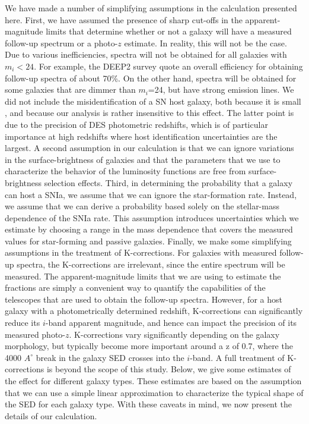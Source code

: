 \documentclass[preprint2]{aastex}    %
\begin{document}
We have made a number of simplifying assumptions in the calculation
presented here. First, we have assumed the presence of sharp cut-offs
in the apparent-magnitude limits that determine whether or not a
galaxy will have a measured follow-up spectrum or a photo-$z$
estimate. In reality, this will not be the case. Due to various
inefficiencies, spectra will not be obtained for all galaxies with
$m_i<24$. For example, the DEEP2 survey \citep{fab07} quote an overall
efficiency for obtaining follow-up spectra of about 70\%. On the other
hand, spectra will be obtained for some galaxies that are dimmer than
$m_i$=24, but have strong emission lines.  
We did not include the misidentification of a SN host galaxy, both
because it is small \cite[][find this to be a 2\% effect at 
low redshift]{smi11}, and because our analysis is rather insensitive to this 
effect. The latter point is
due to the precision of DES photometric redshifts, which is of 
particular importance at high redshifts where host identification 
uncertainties are the largest. 
A second assumption in our calculation is that
we can ignore variations in the surface-brightness of galaxies and
that the parameters that we use to characterize the behavior of the
luminosity functions are free from surface-brightness selection
effects. Third, in determining the probability that a galaxy can host
a SNIa, we assume that we can ignore the star-formation rate. Instead,
we assume that we can derive a probability based solely on the
stellar-mass dependence of the SNIa rate. This assumption introduces
uncertainties which we estimate by choosing a range in the mass
dependence that covers the measured values for star-forming and
passive galaxies.  
Finally, we make some simplifying assumptions in the treatment of K-corrections. 
For galaxies with measured follow-up spectra, the K-corrections are irrelevant, since the entire
spectrum will be measured. The apparent-magnitude limits that we are using to estimate the fractions
are simply a convenient way to quantify the capabilities of the telescopes that are used to obtain 
the follow-up spectra. However, for a host galaxy with a
photometrically determined redshift, K-corrections can significantly reduce its 
$i$-band apparent magnitude, and hence can impact the precision of its measured photo-$z$.
K-corrections vary significantly depending on the galaxy morphology, but typically become
more important around a z of 0.7, where the 4000 $A^\circ$ break in the galaxy SED crosses
into the $i$-band. 
A full treatment of K-corrections is beyond the scope of this study.
Below, we give some estimates of the effect for different galaxy types. These estimates are based 
on the assumption that we can use
a simple linear approximation to characterize the typical shape of the SED for each galaxy type.
With these caveats in mind, we now present the details of our calculation.
\end{document}
